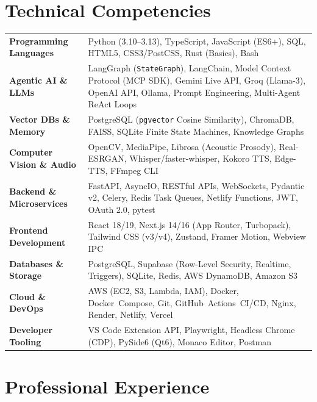 \documentclass[9.5pt]{article}
\begin{document}
\section*{Technical Competencies}

\begin{tabularx}{\textwidth}{@{} >{\raggedright\hyphenpenalty=10000\exhyphenpenalty=10000}p{3.6cm} X @{}}
\textbf{Programming Languages} & Python (3.10--3.13), TypeScript, JavaScript (ES6+), SQL, HTML5, CSS3/PostCSS, Rust (Basics), Bash \\[2pt]
\textbf{Agentic AI \& LLMs}     & LangGraph (\texttt{StateGraph}), LangChain, Model Context Protocol (MCP SDK), Gemini Live API, Groq (Llama-3), OpenAI API, Ollama, Prompt Engineering, Multi-Agent ReAct Loops \\[2pt]
\textbf{Vector DBs \& Memory}   & PostgreSQL (\texttt{pgvector} Cosine Similarity), ChromaDB, FAISS, SQLite Finite State Machines, Knowledge Graphs \\[2pt]
\textbf{Computer Vision \& Audio} & OpenCV, MediaPipe, Librosa (Acoustic Prosody), Real-ESRGAN, Whisper/faster-whisper, Kokoro TTS, Edge-TTS, FFmpeg CLI \\[2pt]
\textbf{Backend \& Microservices} & FastAPI, AsyncIO, RESTful APIs, WebSockets, Pydantic v2, Celery, Redis Task Queues, Netlify Functions, JWT, OAuth 2.0, pytest \\[2pt]
\textbf{Frontend Development}   & React 18/19, Next.js 14/16 (App Router, Turbopack), Tailwind CSS (v3/v4), Zustand, Framer Motion, Webview IPC \\[2pt]
\textbf{Databases \& Storage}   & PostgreSQL, Supabase (Row-Level Security, Realtime, Triggers), SQLite, Redis, AWS DynamoDB, Amazon S3 \\[2pt]
\textbf{Cloud \& DevOps}        & AWS (EC2, S3, Lambda, IAM), Docker, Docker~Compose, Git, GitHub~Actions~CI/CD, Nginx, Render, Netlify, Vercel \\[2pt]
\textbf{Developer Tooling}      & VS Code Extension API, Playwright, Headless Chrome (CDP), PySide6 (Qt6), Monaco Editor, Postman \\
\end{tabularx}

\section*{Professional Experience}
\end{document}
